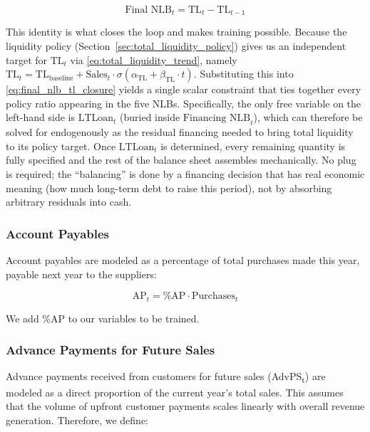 \documentclass[12pt,a4paper]{article}
\begin{document}
\begin{equation}\label{eq:final_nlb_tl_closure}
\text{Final NLB}_t = \text{TL}_t - \text{TL}_{t-1}
\end{equation}

This identity is what closes the loop and makes training possible.
Because the liquidity policy (Section~\ref{sec:total_liquidity_policy})
gives us an independent target for $\text{TL}_t$ via
\eqref{eq:total_liquidity_trend}, namely
$\text{TL}_t = \text{TL}_{\text{baseline}} + \text{Sales}_t \cdot
\sigma(\alpha_{\text{TL}} + \beta_{\text{TL}} \cdot t)$. Substituting
this into \eqref{eq:final_nlb_tl_closure} yields a single scalar
constraint that ties together every policy ratio appearing in the
five NLBs. Specifically, the only free variable on the left-hand side
is $\text{LTLoan}_t$ (buried inside $\text{Financing NLB}_t$), which
can therefore be solved for endogenously as the residual financing
needed to bring total liquidity to its policy target. Once
$\text{LTLoan}_t$ is determined, every remaining quantity is fully
specified and the rest of the balance sheet assembles mechanically.
No plug is required; the ``balancing'' is done by a financing
decision that has real economic meaning (how much long-term debt to
raise this period), not by absorbing arbitrary residuals into cash.

\subsubsection{Account Payables}

Account payables are modeled as a percentage of total purchases made
this year, payable next year to the suppliers:

\begin{equation}\label{eq:account_payables}
\text{AP}_t = \text{\%AP} \cdot \text{Purchases}_t
\end{equation}

We add \%AP to our variables to be trained.

\subsubsection{Advance Payments for Future Sales}

Advance payments received from customers for future sales
(AdvPS\textsubscript{t}) are modeled as a direct proportion of the
current year's total sales. This assumes that the volume
of upfront customer payments scales linearly with overall revenue
generation. Therefore, we define:
\end{document}
